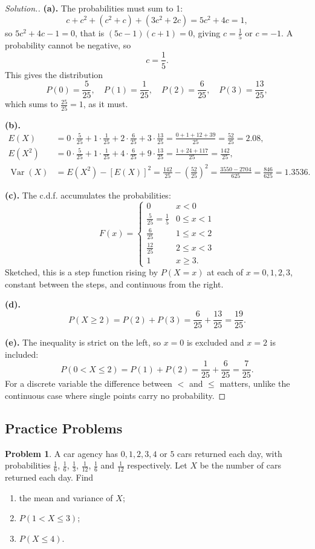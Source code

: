 \documentclass[12pt,a4paper]{report}
\theoremstyle{definition}
\theoremstyle{plain}
\theoremstyle{definition}
\newtheorem{problemx}{Problem}[section]
\newenvironment{problem}{\begin{problemx}}{\end{problemx}}
\newenvironment{solution}
  {\renewcommand{\qedsymbol}{}\begin{proof}[\textit{Solution}.]}
  {\end{proof}}
\begin{document}
\begin{solution}
\textbf{(a).} The probabilities must sum to 1:
\[c + c^2 + (c^2+c) + (3c^2+2c) = 5c^2+4c = 1,\]
so $5c^2+4c-1 = 0$, that is $(5c-1)(c+1) = 0$, giving $c = \tfrac15$ or $c = -1$. A
probability cannot be negative, so
\[c = \frac{1}{5}.\]
This gives the distribution
\[P(0) = \frac{5}{25},\quad P(1) = \frac{1}{25},\quad P(2) = \frac{6}{25},\quad
P(3) = \frac{13}{25},\]
which sums to $\tfrac{25}{25}=1$, as it must.

\textbf{(b).}
\begin{align*}
E(X) &= 0\cdot\tfrac{5}{25}+1\cdot\tfrac{1}{25}+2\cdot\tfrac{6}{25}+3\cdot\tfrac{13}{25}
 = \frac{0+1+12+39}{25} = \frac{52}{25} = 2.08,\\
E(X^2) &= 0\cdot\tfrac{5}{25}+1\cdot\tfrac{1}{25}+4\cdot\tfrac{6}{25}+9\cdot\tfrac{13}{25}
 = \frac{1+24+117}{25} = \frac{142}{25},\\
\operatorname{Var}(X) &= E(X^2)-[E(X)]^2 = \frac{142}{25}-\left(\frac{52}{25}\right)^{2}
 = \frac{3550-2704}{625} = \frac{846}{625} = 1.3536.
\end{align*}

\textbf{(c).} The c.d.f. accumulates the probabilities:
\[F(x) = \begin{cases}
0 & x<0\\
\frac{5}{25} = \frac{1}{5} & 0\leq x<1\\
\frac{6}{25} & 1\leq x<2\\
\frac{12}{25} & 2\leq x<3\\
1 & x\geq 3.
\end{cases}\]
Sketched, this is a step function rising by $P(X=x)$ at each of $x=0,1,2,3$, constant
between the steps, and continuous from the right.

\textbf{(d).} \[P(X\geq 2) = P(2)+P(3) = \frac{6}{25}+\frac{13}{25} = \frac{19}{25}.\]

\textbf{(e).} The inequality is strict on the left, so $x=0$ is excluded and $x=2$ is
included:
\[P(0<X\leq 2) = P(1)+P(2) = \frac{1}{25}+\frac{6}{25} = \frac{7}{25}.\]
For a discrete variable the difference between $<$ and $\leq$ matters, unlike the
continuous case where single points carry no probability.
\end{solution}

\subsection{Practice Problems}

\begin{problem}
A car agency has $0,1,2,3,4$ or $5$ cars returned each day, with probabilities
$\frac{1}{6}$, $\frac{1}{6}$, $\frac{1}{3}$, $\frac{1}{12}$, $\frac{1}{6}$ and
$\frac{1}{12}$ respectively. Let $X$ be the number of cars returned each day. Find
\begin{enumerate}
\item[(a).] the mean and variance of $X$;
\item[(b).] $P(1<X\leq 3)$;
\item[(c).] $P(X\leq 4)$.
\end{enumerate}
\end{problem}
\end{document}
